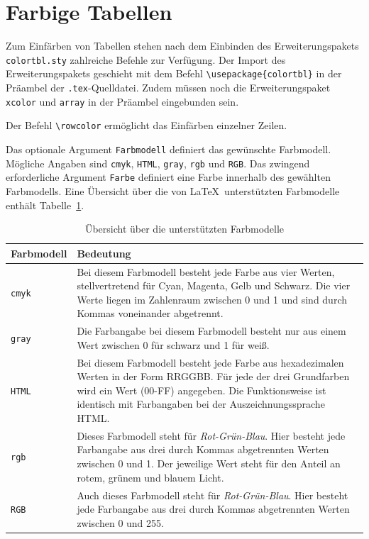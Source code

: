 \documentclass[a4paper,10pt,twoside]{scrbook}
\begin{document}
{\section{Farbige Tabellen}

Zum Einfärben von Tabellen stehen nach dem Einbinden des Erweiterungspakets
\verb!colortbl.sty! zahlreiche Befehle zur Verfügung.  
Der Import des Erweiterungspakets geschieht mit dem Befehl 
\verb!\usepackage{colortbl}! in der Präambel der \verb!.tex!-Quelldatei. Zudem müssen noch die Erweiterungspaket \verb!xcolor! und \verb!array! in der Präambel eingebunden sein.

Der Befehl \verb!\rowcolor! 
ermöglicht das Einfärben einzelner Zeilen.


Das optionale Argument \verb!Farbmodell! definiert das gewünschte Farbmodell.
Mögliche Angaben sind \verb!cmyk!, \verb!HTML!, \verb!gray!, \verb!rgb! und \verb!RGB!.
Das zwingend erforderliche Argument \verb!Farbe! definiert eine Farbe innerhalb des gewählten Farbmodells. Eine Übersicht über die von \LaTeX\ unterstützten Farbmodelle enthält Tabelle~\ref{Tabelle_Farbmodelle}.


\begin{table}[h!tb]
\centering
\caption{Übersicht über die unterstützten Farbmodelle}
\label{Tabelle_Farbmodelle}       %
\begin{tabularx}{\textwidth}{lX}
\hline
Farbmodell & Bedeutung\\
\hline
\texttt{cmyk}\index{CMYK} & Bei diesem Farbmodell besteht jede Farbe aus vier Werten, stellvertretend für Cyan, Magenta, Gelb und Schwarz. Die vier Werte liegen im Zahlenraum zwischen 0 und 1 und sind durch Kommas voneinander abgetrennt. \\
\hline
\texttt{gray} & Die Farbangabe bei diesem Farbmodell besteht nur aus einem Wert zwischen
0 für schwarz und 1 für weiß.\\
\hline
\texttt{HTML}\index{HTML} & Bei diesem Farbmodell besteht jede Farbe aus hexadezimalen Werten in der Form RRGGBB. Für jede der drei Grundfarben wird ein Wert (00-FF) angegeben. Die Funktionsweise ist identisch mit Farbangaben bei der Auszeichnungssprache HTML. \\
\hline
\texttt{rgb} & Dieses Farbmodell steht für \textsl{Rot-Grün-Blau}. Hier besteht jede Farbangabe aus drei durch Kommas abgetrennten Werten zwischen 0 und 1. 
Der jeweilige Wert steht für den Anteil an rotem, grünem und blauem Licht.\\
\hline
\texttt{RGB}\index{RGB} & Auch dieses Farbmodell steht für \textsl{Rot-Grün-Blau}. Hier besteht jede Farbangabe aus drei durch Kommas abgetrennten Werten zwischen 0 und 255. \\
\hline
\end{tabularx}
\end{table}


}
\end{document}
